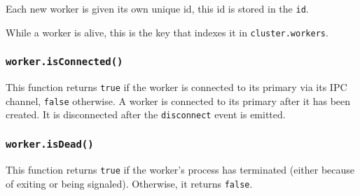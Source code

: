 Each new worker is given its own unique id, this id is stored in the
\texttt{id}.

While a worker is alive, this is the key that indexes it in
\texttt{cluster.workers}.

\subsubsection{\texorpdfstring{\texttt{worker.isConnected()}}{worker.isConnected()}}\label{worker.isconnected}

This function returns \texttt{true} if the worker is connected to its
primary via its IPC channel, \texttt{false} otherwise. A worker is
connected to its primary after it has been created. It is disconnected
after the \texttt{\textquotesingle{}disconnect\textquotesingle{}} event
is emitted.

\subsubsection{\texorpdfstring{\texttt{worker.isDead()}}{worker.isDead()}}\label{worker.isdead}

This function returns \texttt{true} if the worker's process has
terminated (either because of exiting or being signaled). Otherwise, it
returns \texttt{false}.


